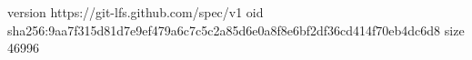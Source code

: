 version https://git-lfs.github.com/spec/v1
oid sha256:9aa7f315d81d7e9ef479a6c7c5c2a85d6e0a8f8e6bf2df36cd414f70eb4dc6d8
size 46996
